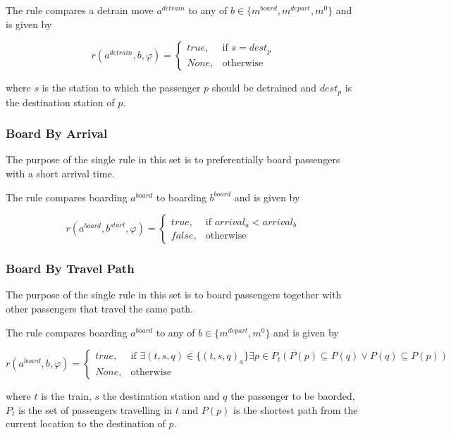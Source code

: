 \documentclass[a4paper,12pt,parskip]{article}
\begin{document}
The rule compares a detrain move $a^{detrain}$ to any of 
$b \in \{m^{board}, m^{depart}, m^0\}$ and is given by

\[
    r(a^{detrain}, b, \varphi) = 
    \begin{cases}
        true,& \text{if } s = dest_p\\
        None,& \text{otherwise}
    \end{cases}
\]

where $s$ is the station to which the passenger $p$ should be detrained and 
$dest_p$ is the destination station of $p$.


\subsubsection{Board By Arrival}
\label{rule:3}

The purpose of the single rule in this set is to preferentially board passengers 
with a short arrival time. 

The rule compares boarding $a^{board}$ to boarding $b^{board}$ and 
is given by

\[
    r(a^{board}, b^{start}, \varphi) = 
    \begin{cases}
        true,& \text{if } arrival_a < arrival_b\\
        false,& \text{otherwise}
    \end{cases}
\]

\subsubsection{Board By Travel Path}
\label{rule:4}

The purpose of the single rule in this set is to board passengers together with 
other passengers that travel the same path.

The rule compares boarding $a^{board}$ to any of $b \in \{m^{depart}, m^0\}$ and 
is given by

\[
    r(a^{board}, b, \varphi) = 
    \begin{cases}
        true,& \text{if } \exists (t,s,q) \in \{(t,s,q)_a\} \exists p \in P_t (P(p) \subseteq P(q) \lor P(q) \subseteq P(p))\\
        None,& \text{otherwise}
    \end{cases}
\]

where $t$ is the train, $s$ the destination station and $q$ the passenger to be 
baorded, $P_t$ is the set of passengers travelling in $t$ and $P(p)$ is 
the shortest path from the current location to the destination of $p$.
\end{document}
